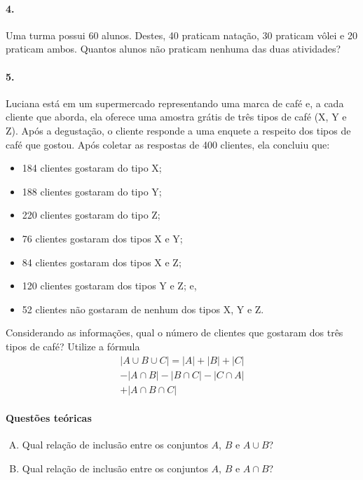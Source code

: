\documentclass[a4paper,twocolumn,12pt]{article}
\begin{document}
\paragraph{4.} Uma turma possui 60 alunos. Destes, 40 praticam natação, 30 praticam vôlei e 20 praticam ambos. Quantos alunos não praticam nenhuma das duas atividades?

\paragraph{5.} Luciana está em um supermercado representando uma marca de café e, a cada cliente que aborda, ela oferece uma amostra grátis de três tipos de café (X, Y e Z). Após a degustação, o cliente responde a uma enquete a respeito dos tipos de café que gostou. Após coletar as respostas de 400 clientes, ela concluiu que:
\begin{itemize}
  \item 184 clientes gostaram do tipo X;
  \item 188 clientes gostaram do tipo Y;
  \item 220 clientes gostaram do tipo Z;
  \item 76 clientes gostaram dos tipos X e Y;
  \item 84 clientes gostaram dos tipos X e Z;
  \item 120 clientes gostaram dos tipos Y e Z; e,
  \item 52 clientes não gostaram de nenhum dos tipos X, Y e Z.
\end{itemize}
Considerando as informações, qual o número de clientes que gostaram dos três tipos de café? Utilize a fórmula 
\begin{multline*}
|A\cup B\cup C| = |A| + |B| + |C| \\ - |A\cap B| - |B\cap C| - |C\cap A| \\ + |A\cap B \cap C|
\end{multline*} 

\paragraph{Questões teóricas}

\begin{enumerate}[A.] 
\item Qual relação de inclusão entre os conjuntos \(A\), \(B\) e \(A\cup B\)?
\item Qual relação de inclusão entre os conjuntos \(A\), \(B\) e \(A\cap B\)?
\end{enumerate}
\end{document}
